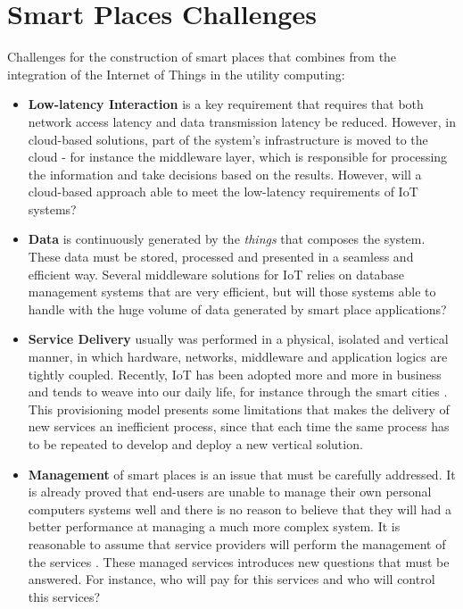 \section{Smart Places Challenges}
\label{section:challenges}
Challenges \cite{caceres2012ubicomp} for the construction of smart places that combines from
the integration of the Internet of Things in the utility computing:

\begin{itemize}
  \item \textbf{Low-latency Interaction} is a key requirement that requires that both network access
  latency and data transmission latency be reduced. However, in cloud-based solutions, part of the
  system's infrastructure is moved to the cloud - for instance the middleware layer, which is responsible
  for processing the information and take decisions based on the results. However, will a cloud-based
  approach able to meet the low-latency requirements of \gls{IoT} systems?
  \item \textbf{Data} is continuously generated by the \textit{things} that composes the system.
  These data must be stored, processed and presented in a seamless and efficient way. Several
  middleware solutions for \gls{IoT} \cite{floerkemeier2007rfid}\cite{eisenhauer2010hydra}\cite{de2008socrades}
  relies on database management systems that are very efficient, but will those systems able to
  handle with the huge volume of data generated by smart place applications?
  \item \textbf{Service Delivery} usually was performed in a physical, isolated and vertical
  manner, in which hardware, networks, middleware and application logics are tightly coupled. Recently,
  \gls{IoT} has been adopted more and more in business and tends to weave into our daily life, for instance
  through the smart cities \cite{caragliu2011smart}\cite{schaffers2011smart}. This provisioning model presents some
  limitations that makes the delivery of new services an inefficient process, since that each time the
  same process has to be repeated to develop and deploy a new vertical solution.
  \item \textbf{Management} of smart places is an issue that must be carefully addressed. It is already
  proved that end-users are unable to manage their own personal computers systems well \cite{doll1988measurement}
  and there is no reason to believe that they will had a better performance at managing a much more
  complex system. It is reasonable to assume that service providers will perform the management of
  the services . These managed services introduces new questions that must be answered. For instance,
  who will pay for this services and who will control this services?
\end{itemize}


